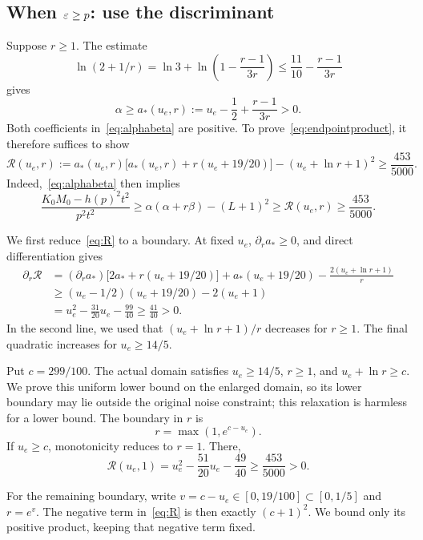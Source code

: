 \subsection{When $\varepsilon\ge p$: use the discriminant}\label{app:rlarge}
Suppose $r\ge1$. The estimate
\[
\ln(2+1/r)=\ln3+\ln\left(1-\frac{r-1}{3r}\right)
\le\frac{11}{10}-\frac{r-1}{3r}
\]
gives
\begin{equation}\label{eq:astar}
\alpha\ge a_*(u_e,r):=u_e-\frac12+\frac{r-1}{3r}>0.
\end{equation}
Both coefficients in~\eqref{eq:alphabeta} are positive. To prove~\eqref{eq:endpointproduct}, it therefore suffices to show
\begin{equation}\label{eq:R}
\mathcal R(u_e,r)
:=a_*(u_e,r)\bigl[a_*(u_e,r)+r(u_e+19/20)\bigr]
-(u_e+\ln r+1)^2\ge\frac{453}{5000}.
\end{equation}
Indeed,~\eqref{eq:alphabeta} then implies
\[
\frac{K_0M_0-h(p)^2t^2}{p^2t^2}
\ge\alpha(\alpha+r\beta)-(L+1)^2
\ge\mathcal R(u_e,r)\ge\frac{453}{5000}.
\]

We first reduce~\eqref{eq:R} to a boundary. At fixed $u_e$, $\partial_r a_*\ge0$, and direct differentiation gives
\begin{align*}
\partial_r\mathcal R
&=(\partial_r a_*)\bigl[2a_*+r(u_e+19/20)\bigr]
+a_*(u_e+19/20)-\frac{2(u_e+\ln r+1)}r\\
&\ge(u_e-1/2)(u_e+19/20)-2(u_e+1)\\
&=u_e^2-\frac{31}{20}u_e-\frac{99}{40}
\ge\frac{41}{40}>0.
\end{align*}
In the second line, we used that $(u_e+\ln r+1)/r$ decreases for $r\ge1$. The final quadratic increases for $u_e\ge14/5$.

Put $c=299/100$. The actual domain satisfies $u_e\ge14/5$, $r\ge1$, and $u_e+\ln r\ge c$. We prove this uniform lower bound on the enlarged domain, so its lower boundary may lie outside the original noise constraint; this relaxation is harmless for a lower bound. The boundary in $r$ is
\[
r=\max(1,e^{c-u_e}).
\]
If $u_e\ge c$, monotonicity reduces to $r=1$. There,
\[
\mathcal R(u_e,1)=u_e^2-\frac{51}{20}u_e-\frac{49}{40}
\ge\frac{453}{5000}>0.
\]

For the remaining boundary, write $v=c-u_e\in[0,19/100]\subset[0,1/5]$ and $r=e^v$. The negative term in~\eqref{eq:R} is then exactly $(c+1)^2$. We bound only its positive product, keeping that negative term fixed.

